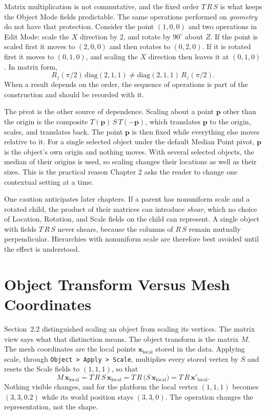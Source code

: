 Matrix multiplication is not commutative, and the fixed order $T\,R\,S$ is what keeps the Object Mode fields predictable. The same operations performed on \emph{geometry} do not have that protection. Consider the point $(1,0,0)$ and two operations in Edit Mode: scale the $X$ direction by $2$, and rotate by $90^\circ$ about $Z$. If the point is scaled first it moves to $(2,0,0)$ and then rotates to $(0,2,0)$. If it is rotated first it moves to $(0,1,0)$, and scaling the $X$ direction then leaves it at $(0,1,0)$. In matrix form,
\[
  R_z(\pi/2)\,\mathrm{diag}(2,1,1)\ne\mathrm{diag}(2,1,1)\,R_z(\pi/2).
\]
When a result depends on the order, the sequence of operations is part of the construction and should be recorded with it.

The pivot is the other source of dependence. Scaling about a point $\mathbf p$ other than the origin is the composite $T(\mathbf p)\,S\,T(-\mathbf p)$, which translates $\mathbf p$ to the origin, scales, and translates back. The point $\mathbf p$ is then fixed while everything else moves relative to it. For a single selected object under the default Median Point pivot, $\mathbf p$ is the object's own origin and nothing moves. With several selected objects, the median of their origins is used, so scaling changes their locations as well as their sizes. This is the practical reason Chapter 2 asks the reader to change one contextual setting at a time.

One caution anticipates later chapters. If a parent has nonuniform scale and a rotated child, the product of their matrices can introduce \emph{shear}, which no choice of Location, Rotation, and Scale fields on the child can represent. A single object with fields $T\,R\,S$ never shears, because the columns of $R\,S$ remain mutually perpendicular. Hierarchies with nonuniform scale are therefore best avoided until the effect is understood.

\section{Object Transform Versus Mesh Coordinates}

Section~2.2 distinguished scaling an object from scaling its vertices. The matrix view says what that distinction means. The object transform is the matrix $M$. The mesh coordinates are the local points $\mathbf x_{\mathrm{local}}$ stored in the data. Applying scale, through \texttt{Object > Apply > Scale}, multiplies every stored vertex by $S$ and resets the Scale fields to $(1,1,1)$, so that
\[
  M\,\mathbf x_{\mathrm{local}}=T\,R\,S\,\mathbf x_{\mathrm{local}}
  =T\,R\,\bigl(S\,\mathbf x_{\mathrm{local}}\bigr)
  =T\,R\,\mathbf x'_{\mathrm{local}}.
\]
Nothing visible changes, and for the platform the local vertex $(1,1,1)$ becomes $(3,3,0.2)$ while its world position stays $(3,3,0)$. The operation changes the representation, not the shape.

